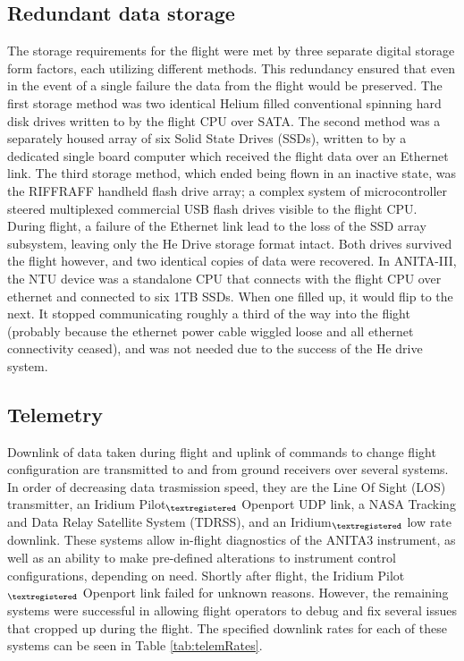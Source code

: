 	\subsection{Redundant data storage}
		The storage requirements for the flight were met by three separate digital storage form factors, each utilizing different methods.  This redundancy ensured that even in the event of a single failure the data from the flight would be preserved.  The first storage method was two identical Helium filled conventional spinning hard disk drives written to by the flight CPU over SATA.  The second method was a separately housed array of six Solid State Drives (SSDs), written to by a dedicated single board computer which received the flight data over an Ethernet link.  The third storage method, which ended being flown in an inactive state, was the RIFFRAFF handheld flash drive array; a complex system of microcontroller steered multiplexed commercial USB flash drives visible to the flight CPU.  During flight, a failure of the Ethernet link lead to the loss of the SSD array subsystem, leaving only the He Drive storage format intact.  Both drives survived the flight however, and two identical copies of data were recovered.
		In ANITA-III, the NTU device was a standalone CPU that connects with the flight CPU over ethernet and connected to six 1TB SSDs.  When one filled up, it would flip to the next.  It stopped communicating roughly a third of the way into the flight (probably because the ethernet power cable wiggled loose and all ethernet connectivity ceased), and was not needed due to the success of the He drive system.
		
	
	\subsection{Telemetry}
		Downlink of data taken during flight and uplink of commands to change flight configuration are transmitted to and from ground receivers over several systems.  In order of decreasing data trasmission speed, they are the Line Of Sight (LOS) transmitter, an Iridium Pilot$_{\textregistered}$ Openport UDP link, a NASA Tracking and Data Relay Satellite System (TDRSS), and an Iridium$_{\textregistered}$ low rate downlink.  These systems allow in-flight diagnostics of the ANITA3 instrument, as well as an ability to make pre-defined alterations to instrument control configurations, depending on need.  Shortly after flight, the Iridium Pilot$_{\textregistered}$ Openport link failed for unknown reasons.  However, the remaining systems were successful in allowing flight operators to debug and fix several issues that cropped up during the flight.  The specified downlink rates for each of these systems can be seen in Table \ref{tab:telemRates}.
		
